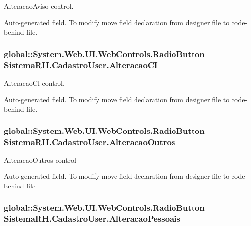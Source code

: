 AlteracaoAviso control. 

Auto-\/generated field. To modify move field declaration from designer file to code-\/behind file. \hypertarget{class_sistema_r_h_1_1_cadastro_user_aff41ea22a6a0792bdea569a01bd8728b}{
\subsubsection[{AlteracaoCI}]{\setlength{\rightskip}{0pt plus 5cm}global::System.Web.UI.WebControls.RadioButton {\bf SistemaRH.CadastroUser.AlteracaoCI}}}
\label{class_sistema_r_h_1_1_cadastro_user_aff41ea22a6a0792bdea569a01bd8728b}


AlteracaoCI control. 

Auto-\/generated field. To modify move field declaration from designer file to code-\/behind file. \hypertarget{class_sistema_r_h_1_1_cadastro_user_aff33b5e443d82ec7ae5cb1ad0e80ca00}{
\subsubsection[{AlteracaoOutros}]{\setlength{\rightskip}{0pt plus 5cm}global::System.Web.UI.WebControls.RadioButton {\bf SistemaRH.CadastroUser.AlteracaoOutros}}}
\label{class_sistema_r_h_1_1_cadastro_user_aff33b5e443d82ec7ae5cb1ad0e80ca00}


AlteracaoOutros control. 

Auto-\/generated field. To modify move field declaration from designer file to code-\/behind file. \hypertarget{class_sistema_r_h_1_1_cadastro_user_a9874f855765f57c9d29cb9aec040237f}{
\subsubsection[{AlteracaoPessoais}]{\setlength{\rightskip}{0pt plus 5cm}global::System.Web.UI.WebControls.RadioButton {\bf SistemaRH.CadastroUser.AlteracaoPessoais}}}
\label{class_sistema_r_h_1_1_cadastro_user_a9874f855765f57c9d29cb9aec040237f}


